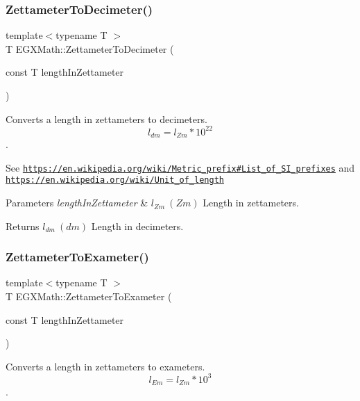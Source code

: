 \subsubsection{\texorpdfstring{Zettameter\+To\+Decimeter()}{ZettameterToDecimeter()}}
{\footnotesize\ttfamily template$<$typename T $>$ \\
T E\+G\+X\+Math\+::\+Zettameter\+To\+Decimeter (\begin{DoxyParamCaption}\item[{const T}]{length\+In\+Zettameter }\end{DoxyParamCaption})}



Converts a length in zettameters to decimeters. \[ l_{dm}=l_{Zm} * 10^{22} \]. 

See \href{https://en.wikipedia.org/wiki/Metric_prefix#List_of_SI_prefixes}{\tt https\+://en.\+wikipedia.\+org/wiki/\+Metric\+\_\+prefix\#\+List\+\_\+of\+\_\+\+S\+I\+\_\+prefixes} and \href{https://en.wikipedia.org/wiki/Unit_of_length}{\tt https\+://en.\+wikipedia.\+org/wiki/\+Unit\+\_\+of\+\_\+length} 
\begin{DoxyParams}{Parameters}
{\em length\+In\+Zettameter} & $ l_{Zm}\ (Zm)$ Length in zettameters. \\
\hline
\end{DoxyParams}
\begin{DoxyReturn}{Returns}
$ l_{dm}\ (dm)$ Length in decimeters. 
\end{DoxyReturn}
\mbox{\label{group___e_g_x_math-_conversions-_length_conversions-_s_i-_zettameter-_s_i_ga7d9638e3c012b4ff3ad3dc0e0f0393b2}} 
\subsubsection{\texorpdfstring{Zettameter\+To\+Exameter()}{ZettameterToExameter()}}
{\footnotesize\ttfamily template$<$typename T $>$ \\
T E\+G\+X\+Math\+::\+Zettameter\+To\+Exameter (\begin{DoxyParamCaption}\item[{const T}]{length\+In\+Zettameter }\end{DoxyParamCaption})}



Converts a length in zettameters to exameters. \[ l_{Em}=l_{Zm} * 10^{3} \]. 

